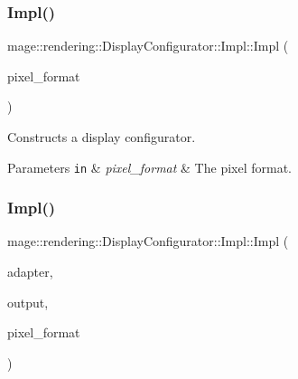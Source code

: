 \subsubsection{\texorpdfstring{Impl()}{Impl()}\hspace{0.1cm}{\footnotesize\ttfamily [1/4]}}
{\footnotesize\ttfamily mage\+::rendering\+::\+Display\+Configurator\+::\+Impl\+::\+Impl (\begin{DoxyParamCaption}\item[{D\+X\+G\+I\+\_\+\+F\+O\+R\+M\+AT}]{pixel\+\_\+format }\end{DoxyParamCaption})\hspace{0.3cm}{\ttfamily [explicit]}}

Constructs a display configurator.


\begin{DoxyParams}[1]{Parameters}
\mbox{\tt in}  & {\em pixel\+\_\+format} & The pixel format. \\
\hline
\end{DoxyParams}
\hypertarget{classmage_1_1rendering_1_1_display_configurator_1_1_impl_ab87ea2074c7c6ecdbb97ac68f96ed39f}{}\label{classmage_1_1rendering_1_1_display_configurator_1_1_impl_ab87ea2074c7c6ecdbb97ac68f96ed39f} 
\subsubsection{\texorpdfstring{Impl()}{Impl()}\hspace{0.1cm}{\footnotesize\ttfamily [2/4]}}
{\footnotesize\ttfamily mage\+::rendering\+::\+Display\+Configurator\+::\+Impl\+::\+Impl (\begin{DoxyParamCaption}\item[{\hyperlink{namespacemage_ae74f374780900893caa5555d1031fd79}{Com\+Ptr}$<$ \hyperlink{namespacemage_1_1rendering_ad55e028ebd705b547eeb972ad8d03b6a}{D\+X\+G\+I\+Adapter} $>$}]{adapter,  }\item[{\hyperlink{namespacemage_ae74f374780900893caa5555d1031fd79}{Com\+Ptr}$<$ \hyperlink{namespacemage_1_1rendering_aaf22d3893277a4bd8497f6ea69b01532}{D\+X\+G\+I\+Output} $>$}]{output,  }\item[{D\+X\+G\+I\+\_\+\+F\+O\+R\+M\+AT}]{pixel\+\_\+format }\end{DoxyParamCaption})\hspace{0.3cm}{\ttfamily [explicit]}}

